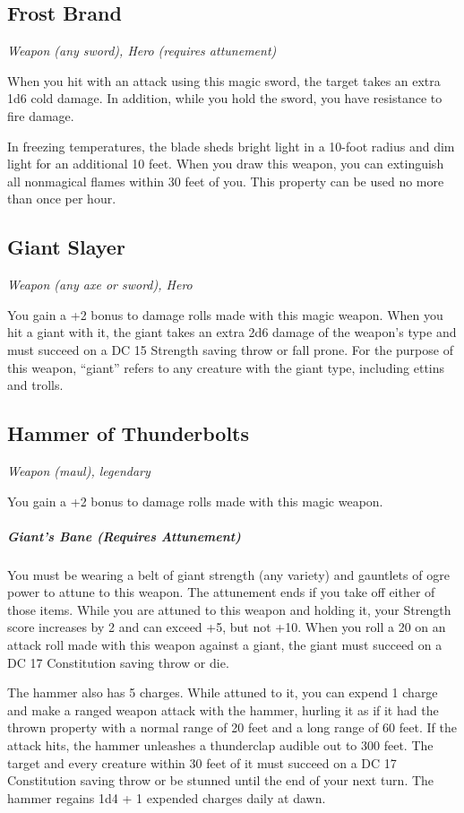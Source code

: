 \subsection{Frost Brand}
\textit{Weapon (any sword), Hero (requires attunement)} 

When you hit with an attack using this magic sword, the target takes an extra 1d6 cold damage. In addition, while you hold the sword, you have resistance to fire damage.

In freezing temperatures, the blade sheds bright light in a 10-foot radius and dim light for an additional 10 feet. When you draw this weapon, you can extinguish all nonmagical flames within 30 feet of you. This property can be used no more than once per hour.

\subsection{Giant Slayer}
\textit{Weapon (any axe or sword), Hero} 

You gain a +2 bonus to damage rolls made with this magic weapon.  When you hit a giant with it, the giant takes an extra 2d6 damage of the weapon's type and must succeed on a DC 15 Strength saving throw or fall prone. For the purpose of this weapon, “giant” refers to any creature with the giant type, including ettins and trolls.

\subsection{Hammer of Thunderbolts}
\textit{Weapon (maul), legendary}

You gain a +2 bonus to damage rolls made with this magic weapon.

\subparagraph*{Giant's Bane (Requires Attunement)} You must be wearing a belt of giant strength (any variety) and gauntlets of ogre power to attune to this weapon. The attunement ends if you take off either of those items. While you are attuned to this weapon and holding it, your Strength score increases by 2 and can exceed +5, but not +10. When you roll a 20 on an attack roll made with this weapon against a giant, the giant must succeed on a DC 17 Constitution saving throw or die.

The hammer also has 5 charges. While attuned to it, you can expend 1 charge and make a ranged weapon attack with the hammer, hurling it as if it had the thrown property with a normal range of 20 feet and a long range of 60 feet. If the attack hits, the hammer unleashes a thunderclap audible out to 300 feet. The target and every creature within 30 feet of it must succeed on a DC 17 Constitution saving throw or be stunned until the end of your next turn. The hammer regains 1d4 + 1 expended charges daily at dawn.


